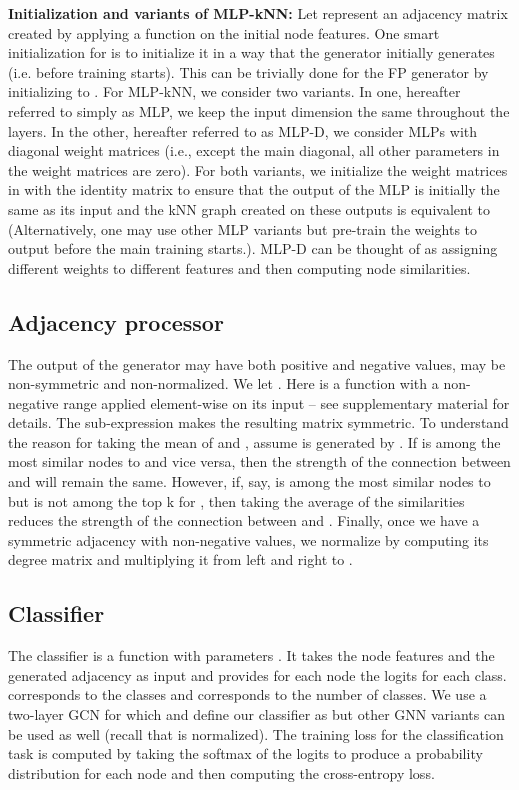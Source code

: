 \documentclass{article}
\begin{document}
\textbf{Initialization and variants of MLP-kNN:}
Let  represent an adjacency matrix created by applying a  function on the initial node features. One smart initialization for  is to initialize it in a way that the generator initially generates  (i.e.  before training starts). This can be trivially done for the FP generator by initializing  to . 
For MLP-kNN, we consider two variants. In one, hereafter referred to simply as MLP, we keep the input dimension the same throughout the layers. In the other, hereafter referred to as MLP-D, we consider MLPs with diagonal weight matrices (i.e., except the main diagonal, all other parameters in the weight matrices are zero). For both variants, we initialize the weight matrices in  with the identity matrix to ensure that the output of the MLP is initially the same as its input and the kNN graph created on these outputs is equivalent to  (Alternatively, one may use other MLP variants but pre-train the weights to output  before the main training starts.). MLP-D can be thought of as assigning different weights to different features and then computing node similarities.

\subsection{Adjacency processor} \label{sec:processor}
The output  of the generator may have both positive and negative values, may be non-symmetric and non-normalized. We let .
Here  is a function with a non-negative range applied element-wise on its input -- see supplementary material for details. The sub-expression  makes the resulting matrix  symmetric. To understand the reason for taking the mean of  and , assume  is generated by . If  is among the  most similar nodes to  and vice versa, then the strength of the connection between  and  will remain the same. However, if, say,  is among the  most similar nodes to  but  is not among the top k for , then taking the average of the similarities reduces the strength of the connection between  and . Finally, once we have a symmetric adjacency with non-negative values, we normalize  by computing its degree matrix  and multiplying it from left and right to .

\subsection{Classifier} \label{sec:classifier}
The classifier is a function  with parameters . It takes the node features  and the generated adjacency  as input and provides for each node the logits for each class.  corresponds to the classes and  corresponds to the number of classes. We use a two-layer GCN for which  and define our classifier as  but other GNN variants can be used as well (recall that  is normalized). The training loss  for the classification task is computed by taking the softmax of the logits to produce a probability distribution for each node and then computing the cross-entropy loss.
\end{document}
